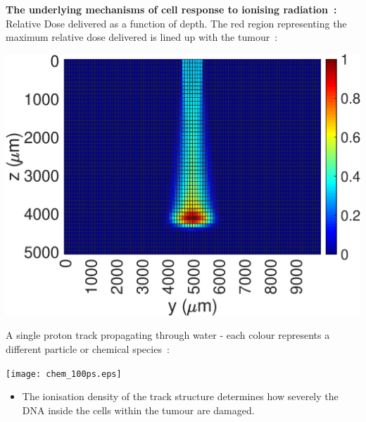 \documentclass[a3paper,fleqn]{betterposter}
\begin{document}
{\vfill

}{
\vfill
\textbf{The underlying mechanisms of cell response to ionising radiation~:}
\vfill
Relative Dose delivered as a function of depth. The red region representing the maximum relative dose delivered is lined up with the tumour~:

\begin{center}
    \includegraphics[width=\textwidth]{doseheatmap_depth.eps}
\end{center}

A single proton track propagating through water - each colour represents a different particle or chemical species~:
\begin{center}
\texttt{[image: chem\_100ps.eps]}
\end{center}
\begin{itemize}
    \item The ionisation density of the track structure determines how severely the DNA inside the cells within the tumour are damaged.
\end{itemize}

}
\end{document}
